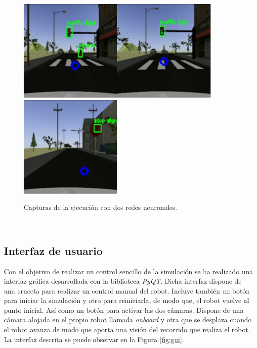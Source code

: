 \begin{figure} [h!]
	\begin{center}
		\includegraphics[width=5cm]{figs/simRed}\hspace{0.1cm}\includegraphics[width=5cm]{figs/simGreen}\hspace{0.1cm}\includegraphics[width=5cm]{figs/simStop}
	\end{center}
	\caption{Capturas de la ejecución con dos redes neuronales.}
	\label{fig:simexecution}
\end{figure}\

\subsection{Interfaz de usuario}
\label{subsection:interface}
Con el objetivo de realizar un control sencillo de la simulación se ha realizado una interfaz gráfica desarrollada con la biblioteca \textit{PyQT}. Dicha interfaz dispone de una
cruceta para realizar un control manual del robot. Incluye también un botón para iniciar la simulación y otro para reiniciarla, de modo que, el robot vuelve al punto inicial. Así
como un botón para activar las dos cámaras. Dispone de una cámara alojada en el propio robot llamada \textit{onboard} y otra que se desplaza cuando el robot avanza de modo que
aporta una visión del recorrido que realiza el robot. La interfaz descrita se puede observar en la Figura \ref{fig:gui}.\\

